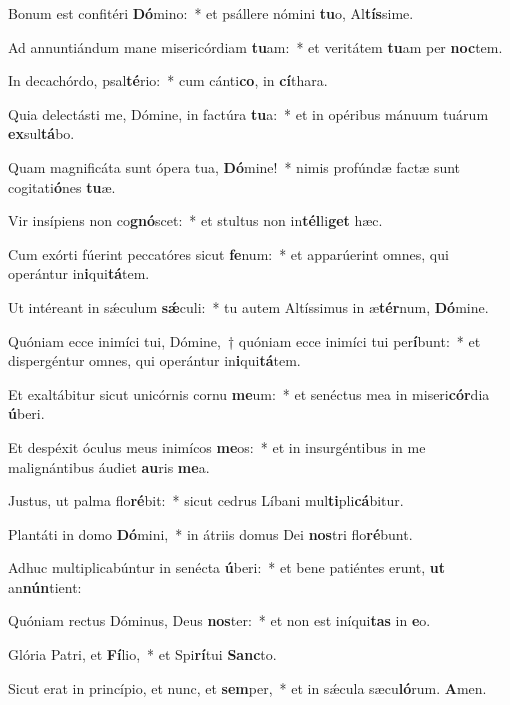 \item Bonum est confitéri \textbf{Dó}mino:~* et psállere nómini \textbf{tu}o, Al\textbf{tís}sime.

\item Ad annuntiándum mane misericórdiam \textbf{tu}am:~* et veritátem \textbf{tu}am per \textbf{noc}tem.

\item In decachórdo, psal\textbf{té}rio:~* cum cánti\textbf{co}, in \textbf{cí}thara.

\item Quia delectásti me, Dómine, in factúra \textbf{tu}a:~* et in opéribus mánuum tuárum \textbf{ex}sul\textbf{tá}bo.

\item Quam magnificáta sunt ópera tua, \textbf{Dó}mine!~* nimis profúndæ factæ sunt cogitati\textbf{ó}nes \textbf{tu}æ.

\item Vir insípiens non co\textbf{gnó}scet:~* et stultus non in\textbf{tél}li\textbf{get} hæc.

\item Cum exórti fúerint peccatóres sicut \textbf{fe}num:~* et apparúerint omnes, qui operántur in\textbf{i}qui\textbf{tá}tem.

\item Ut intéreant in sǽculum \textbf{sǽ}culi:~* tu autem Altíssimus in æ\textbf{tér}num, \textbf{Dó}mine.

\item Quóniam ecce inimíci tui, Dómine,~† quóniam ecce inimíci tui per\textbf{í}bunt:~* et dispergéntur omnes, qui operántur in\textbf{i}qui\textbf{tá}tem.

\item Et exaltábitur sicut unicórnis cornu \textbf{me}um:~* et senéctus mea in miseri\textbf{cór}dia \textbf{ú}beri.

\item Et despéxit óculus meus inimícos \textbf{me}os:~* et in insurgéntibus in me malignántibus áudiet \textbf{au}ris \textbf{me}a.

\item Justus, ut palma flo\textbf{ré}bit:~* sicut cedrus Líbani mul\textbf{ti}pli\textbf{cá}bitur.

\item Plantáti in domo \textbf{Dó}mini,~* in átriis domus Dei \textbf{nos}tri flo\textbf{ré}bunt.

\item Adhuc multiplicabúntur in senécta \textbf{ú}beri:~* et bene patiéntes erunt, \textbf{ut} an\textbf{nún}tient:

\item Quóniam rectus Dóminus, Deus \textbf{nos}ter:~* et non est iníqui\textbf{tas} in \textbf{e}o.

\item Glória Patri, et \textbf{Fí}lio,~* et Spi\textbf{rí}tui \textbf{Sanc}to.

\item Sicut erat in princípio, et nunc, et \textbf{sem}per,~* et in sǽcula sæcu\textbf{ló}rum. \textbf{A}men.
